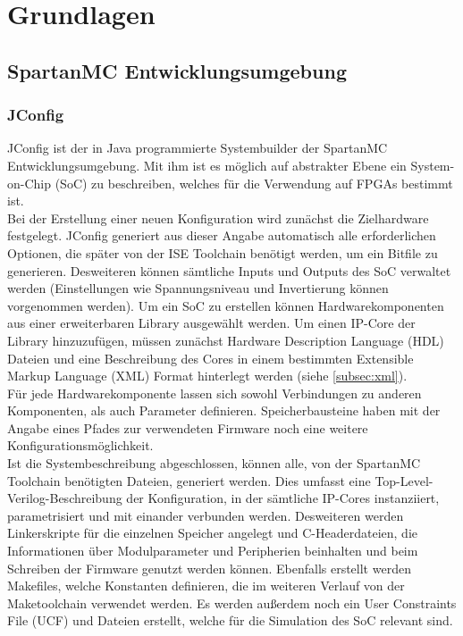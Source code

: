 \chapter{Grundlagen}
\section{SpartanMC Entwicklungsumgebung}
\subsection{JConfig}
JConfig ist der in Java programmierte Systembuilder der SpartanMC Entwicklungsumgebung. Mit ihm ist es möglich
auf abstrakter Ebene ein System-on-Chip (SoC) zu beschreiben, welches für die Verwendung auf FPGAs bestimmt ist. \\
Bei der Erstellung einer neuen Konfiguration wird zunächst die Zielhardware festgelegt. JConfig generiert aus dieser
Angabe automatisch alle erforderlichen Optionen, die später von der ISE Toolchain benötigt werden, um ein Bitfile
zu generieren. Desweiteren können sämtliche Inputs und Outputs des SoC verwaltet werden (Einstellungen wie Spannungsniveau 
und Invertierung können vorgenommen werden).
Um ein SoC zu erstellen können Hardwarekomponenten aus einer erweiterbaren Library ausgewählt werden. Um einen IP-Core der
Library hinzuzufügen, müssen zunächst Hardware Description Language (HDL) Dateien und eine Beschreibung des Cores in einem bestimmten Extensible Markup Language (XML) Format hinterlegt werden (siehe \ref{subsec:xml}).\\
Für jede Hardwarekomponente lassen sich sowohl Verbindungen zu anderen Komponenten, als auch Parameter definieren.
Speicherbausteine haben mit der Angabe eines Pfades zur verwendeten Firmware noch eine weitere Konfigurationsmöglichkeit.\\
Ist die Systembeschreibung abgeschlossen, können alle, von der SpartanMC Toolchain benötigten Dateien, generiert werden.
Dies umfasst eine Top-Level-Verilog-Beschreibung der Konfiguration, in der sämtliche IP-Cores instanziiert, parametrisiert und mit
einander verbunden werden. Desweiteren werden Linkerskripte für die einzelnen Speicher angelegt und C-Headerdateien, die Informationen
über Modulparameter und Peripherien beinhalten und beim Schreiben der Firmware genutzt werden können. Ebenfalls erstellt werden
Makefiles, welche Konstanten definieren, die im weiteren Verlauf von der Maketoolchain verwendet werden. Es werden außerdem noch ein
User Constraints File (UCF) und Dateien erstellt, welche für die Simulation des SoC relevant sind.

